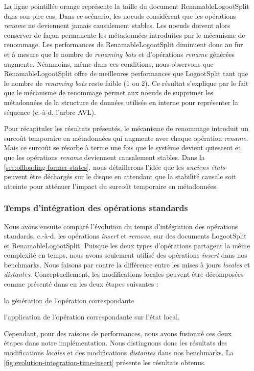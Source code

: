 \documentclass[12pt]{thesul}
\newcommand{\ie}{c.-à-d. }
\begin{document}
La ligne pointillée orange représente la taille du document RenamableLogootSplit dans son pire cas.
Dans ce scénario, les noeuds considèrent que les opérations \emph{rename} ne deviennent jamais causalement stables.
Les noeuds doivent alors conserver de façon permanente les métadonnées introduites par le mécanisme de renommage.
Les performances de RenamableLogootSplit diminuent donc au fur et à mesure que le nombre de \emph{renaming bots} et d'opérations \emph{rename} générées augmente.
Néanmoins, même dans ces conditions, nous observons que RenamableLogootSplit offre de meilleures performances que LogootSplit tant que le nombre de \emph{renaming bots} reste faible (1 ou 2).
Ce résultat s'explique par le fait que le mécanisme de renommage permet aux noeuds de supprimer les métadonnées de la structure de données utilisée en interne pour représenter la séquence (\ie l'arbre AVL).

Pour récapituler les résultats présentés, le mécanisme de renommage introduit un surcoût temporaire en métadonnées qui augmente avec chaque opération \emph{rename}.
Mais ce surcoût se résorbe à terme une fois que le système devient quiescent et que les opérations \emph{rename} deviennent causalement stables.
Dans la \autoref{sec:offloading-former-states}, nous détaillerons l'idée que les \emph{anciens états} peuvent être déchargés sur le disque en attendant que la stabilité causale soit atteinte pour atténuer l'impact du surcoût temporaire en métadonnées.

\subsubsection{Temps d'intégration des opérations standards}

Nous avons ensuite comparé l'évolution du temps d'intégration des opérations standards, \ie les opérations \emph{insert} et \emph{remove}, sur des documents LogootSplit et RenamableLogootSplit.
Puisque les deux types d'opérations partagent la même complexité en temps, nous avons seulement utilisé des opérations \emph{insert} dans nos benchmarks.
Nous faisons par contre la différence entre les mises à jours \emph{locales} et \emph{distantes}.
Conceptuellement, les modifications locales peuvent être décomposées comme présenté dans \cite{baquero2017pure} en les deux étapes suivantes :
\begin{enumerate*}[label=(\roman*)]
  \item la génération de l'opération correspondante
  \item l'application de l'opération correspondante sur l'état local.
\end{enumerate*}
Cependant, pour des raisons de performances, nous avons fusionné ces deux étapes dans notre implémentation.
Nous distinguons donc les résultats des modifications \emph{locales} et des modifications \emph{distantes} dans nos benchmarks.
La \autoref{fig:evolution-integration-time-insert} présente les résultats obtenus.
\end{document}
